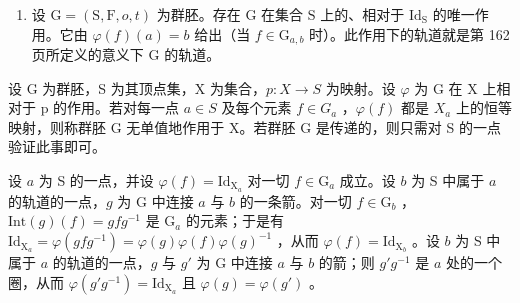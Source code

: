 \begin{enumerate}
\def\labelenumi{\arabic{enumi})}
\setcounter{enumi}{1}
\tightlist
\item
  设 \(\mathrm{G} = (\mathrm{S},\mathrm{F},o,t)\) 为群胚。存在 \(\mathrm{G}\) 在集合 \(\mathrm{S}\) 上的、相对于 \(\mathrm{Id}_{\mathrm{S}}\) 的唯一作用。它由 \(\varphi(f)(a) = b\) 给出（当 \(f \in \mathrm{G}_{a,b}\) 时）。此作用下的轨道就是第 162 页所定义的意义下 \(\mathrm{G}\) 的轨道。
\end{enumerate}

设 G 为群胚，S 为其顶点集，X 为集合，\(p: X \to S\) 为映射。设 \(\varphi\) 为 G 在 X 上相对于 p 的作用。若对每一点 \(a \in S\) 及每个元素 \(f \in G_{a}\) ，\(\varphi(f)\) 都是 \(X_{a}\) 上的恒等映射，则称群胚 G 无单值地作用于 X。若群胚 G 是传递的，则只需对 S 的一点验证此事即可。

设 \(a\) 为 S 的一点，并设 \(\varphi(f) = \mathrm{Id}_{\mathrm{X}_a}\) 对一切 \(f \in \mathrm{G}_a\) 成立。设 \(b\) 为 S 中属于 \(a\) 的轨道的一点，\(g\) 为 G 中连接 \(a\) 与 \(b\) 的一条箭。对一切 \(f \in \mathrm{G}_b\) ，\(\mathrm{Int}(g)(f) = gfg^{-1}\) 是 \(\mathrm{G}_a\) 的元素；于是有 \(\mathrm{Id}_{\mathrm{X}_a} = \varphi(gfg^{-1}) = \varphi(g)\varphi(f)\varphi(g)^{-1}\) ，从而 \(\varphi(f) = \mathrm{Id}_{\mathrm{X}_b}\) 。设 \(b\) 为 S 中属于 \(a\) 的轨道的一点，\(g\) 与 \(g'\) 为 G 中连接 \(a\) 与 \(b\) 的箭；则 \(g'g^{-1}\) 是 \(a\) 处的一个圈，从而 \(\varphi(g'g^{-1}) = \mathrm{Id}_{\mathrm{X}_a}\) 且 \(\varphi(g) = \varphi(g')\) 。

